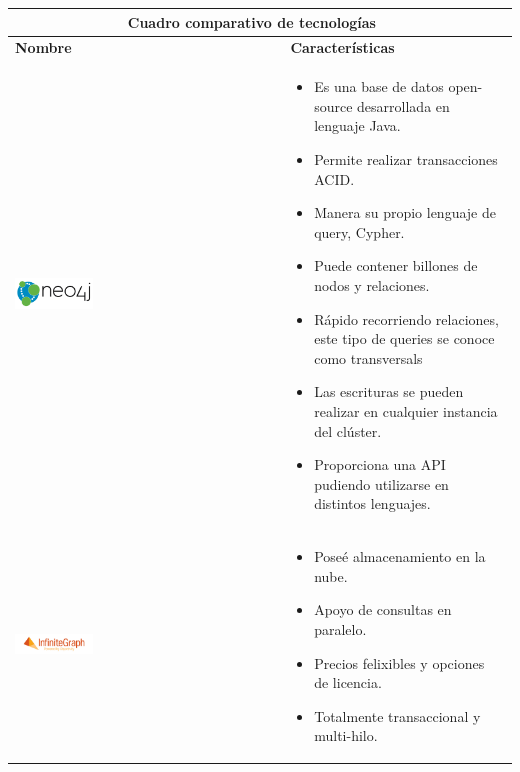 \newpage
	\begin{table}[b!]
    \centering
      \begin{tabular}{|p{2cm}|ll}
        \hline
        \multicolumn{2}{|c|}{{\bf Cuadro comparativo de tecnologías}} \\ 
        \hline
          \multicolumn{1}{|p{4cm}|}{{\bf Nombre}} & 
		  \multicolumn{1}{p{10cm}|}{{\bf Características}}\\
        \hline
          \multicolumn{1}{|p{5cm}|}{\includegraphics[width=0.3\textwidth]{images/neo4j}} & 
          \multicolumn{2}{p{10cm}|}{\begin{itemize}
          \vspace{-15mm}
        \item Es una base de datos open-source desarrollada en lenguaje Java.
        \item Permite realizar transacciones ACID.
        \item Manera su propio lenguaje de query, Cypher.
        \item Puede contener billones de nodos y relaciones.
        \item Rápido recorriendo relaciones, este tipo de queries se conoce como transversals
        \item Las escrituras se pueden realizar en cualquier instancia del clúster.
        \item Proporciona una API pudiendo utilizarse en distintos lenguajes.
        \cite{31}
      \end{itemize}} \\
        \hline
          \multicolumn{1}{|p{5cm}|}{\includegraphics[width=0.3\textwidth]{images/InfiniteGraph}} & 
          \multicolumn{1}{p{10cm}|}{
          \begin{itemize}
          \vspace{-7mm}
        \item Poseé almacenamiento en la nube.
        \item Apoyo de consultas en paralelo.
        \item Precios felixibles y opciones de licencia.
        \item Totalmente transaccional y multi-hilo.

\end{itemize}}
\end{tabular}
\end{table}
